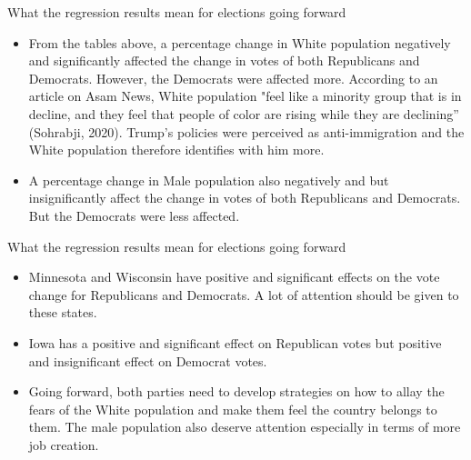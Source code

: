 \documentclass[11pt]{beamer}
\begin{document}
\begin{frame}{What the regression results mean for elections going forward}
\begin{itemize}

\item From the tables above, a percentage change in White population negatively and significantly affected the change in votes of both Republicans and Democrats. However, the Democrats were affected more. According to an article on Asam News, White population "feel like a minority group that is in decline, and they feel that people of color are rising while they are declining” (Sohrabji, 2020). Trump's policies were perceived as anti-immigration and the White population therefore identifies with him more.

\item A percentage change in Male population also negatively and but insignificantly affect the change in votes of both Republicans and Democrats. But the Democrats were less affected.

\end{itemize}
\end{frame}

\begin{frame}{What the regression results mean for elections going forward}
\begin{itemize}

\item Minnesota and Wisconsin have positive and significant effects on the vote change for Republicans and Democrats. A lot of attention should be given to these states.

\item Iowa has a positive and significant effect on Republican votes but positive and insignificant effect on Democrat votes.

\item Going forward, both parties need to develop strategies on how to allay the fears of the White population and make them feel the country belongs to them. The male population also deserve attention especially in terms of more job creation.

\end{itemize}
\end{frame}
\end{document}
